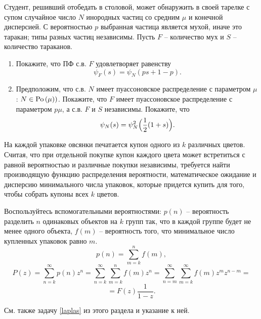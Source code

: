 \begin{problem}
Студент, решивший отобедать в 
столовой, может обнаружить в своей тарелке с супом случайное число $N$ 
инородных частиц со средним $\mu $ и конечной дисперсией. С 
вероятностью $p$ выбранная частица является мухой, иначе это таракан; типы 
разных частиц независимы. Пусть $F$ -- количество мух и $S$ -- количество тараканов.

\begin{enumerate}
\item Покажите, что ПФ с.в. $F$ удовлетворяет равенству
\[
\psi _F (s)=\psi _N (ps+1-p).
\]

\item Предположим, что с.в. $N$ имеет пуассоновское 
распределение с параметром $\mu$:  $N\in \mathrm{Po}\left( \mu \right))$. Покажите, что $F$ имеет пуассоновское распределение с 
параметром $p\mu $, а с.в. $F$ и $S$ независимы. Покажите, что
\[
\psi _N (s)=\psi _N^2 \Bigl( {\frac{1}{2}(1+s)} \Bigr).
\]
\end{enumerate}

\end{problem}


\begin{problem}[Соболевский А.Н.]
На каждой упаковке овсянки печатается купон одного из $k$ различных цветов. Считая, что при отдельной покупке купон каждого цвета может встретиться с равной вероятностью и различные покупки независимы, требуется найти производящую функцию распределения вероятности, математическое ожидание и дисперсию минимального числа упаковок, которые придется купить для того, чтобы собрать купоны всех $k$ цветов.
\end{problem}

\begin{ordre}
Воспользуйтесь вспомогательными вероятностями: $p(n)$ -- вероятность разделить $n$ одинаковых объектов на $k$ групп так, что в каждой группе будет не менее  одного объекта, $f(m)$ -- вероятность того, что минимальное число купленных  упаковок равно $m$.
\[
p(n) = \sum_{m = k}^{n} f(m), 
\]
\[
P(z) = \sum_{n=k}^{\infty} p(n) z^n = \sum_{n=k}^{\infty} \sum_{m = k}^{n} f(m) z^n = 
\sum_{n=m}^{\infty} \sum_{m = k}^{\infty} f(m) z^m z^{n-m} = 
\]
\[=
F(z) \frac{1}{1-z}.
\]    

См. также задачу \ref{laplas} из этого раздела и указание к ней.
\end{ordre}


